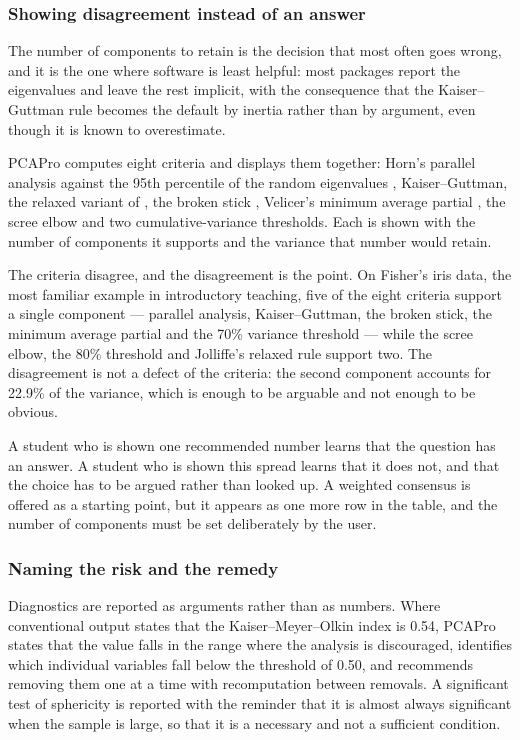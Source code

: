\documentclass[12pt]{article}
\begin{document}
\subsubsection{Showing disagreement instead of an answer}

The number of components to retain is the decision that most often goes wrong,
and it is the one where software is least helpful: most packages report the
eigenvalues and leave the rest implicit, with the consequence that the
Kaiser--Guttman rule becomes the default by inertia rather than by argument,
even though it is known to overestimate.

PCAPro computes eight criteria and displays them together: Horn's parallel
analysis \citep{horn1965} against the 95th percentile of the random eigenvalues
\citep{glorfeld1995}, Kaiser--Guttman, the relaxed variant of
\citet{jolliffe2002}, the broken stick \citep{frontier1976}, Velicer's minimum
average partial \citep{velicer1976}, the scree elbow \citep{cattell1966} and two
cumulative-variance thresholds. Each is shown with the number of components it
supports and the variance that number would retain.

The criteria disagree, and the disagreement is the point. On Fisher's iris data,
the most familiar example in introductory teaching, five of the eight criteria
support a single component --- parallel analysis, Kaiser--Guttman, the broken
stick, the minimum average partial and the 70\% variance threshold --- while the
scree elbow, the 80\% threshold and Jolliffe's relaxed rule support two. The
disagreement is not a defect of the criteria: the second component accounts for
22.9\% of the variance, which is enough to be arguable and not enough to be
obvious.

A student who is shown one recommended number learns that the question has an
answer. A student who is shown this spread learns that it does not, and that the
choice has to be argued rather than looked up. A weighted consensus is offered
as a starting point, but it appears as one more row in the table, and the number
of components must be set deliberately by the user.

\subsubsection{Naming the risk and the remedy}

Diagnostics are reported as arguments rather than as numbers. Where conventional
output states that the Kaiser--Meyer--Olkin index \citep{kaiser1974} is 0.54,
PCAPro states that the value falls in the range where the analysis is
discouraged, identifies which individual variables fall below the threshold of
0.50, and recommends removing them one at a time with recomputation between
removals. A significant test of sphericity \citep{bartlett1950} is reported with
the reminder that it is almost always significant when the sample is large, so
that it is a necessary and not a sufficient condition.
\end{document}

